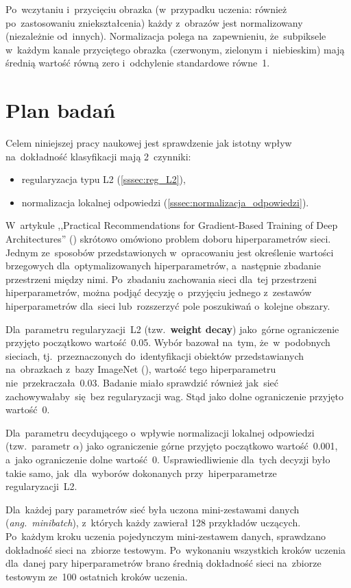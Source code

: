 Po~wczytaniu i~przycięciu obrazka (w~przypadku uczenia: również po~zastosowaniu zniekształcenia) każdy z~obrazów jest
normalizowany (niezależnie od~innych). Normalizacja polega na~zapewnieniu, że~subpiksele w~każdym kanale
przyciętego obrazka (czerwonym, zielonym i~niebieskim) mają średnią wartość równą zero i~odchylenie standardowe równe~1.



\section{Plan badań} \label{sec:plan-badan}
Celem niniejszej pracy naukowej jest sprawdzenie jak istotny wpływ na~dokładność klasyfikacji mają 2~czynniki:
\begin{itemize}
    \item regularyzacja typu L2 (\ref{sssec:reg_L2}),
    \item normalizacja lokalnej odpowiedzi (\ref{sssec:normalizacja_odpowiedzi}).
\end{itemize}

W~artykule ,,Practical Recommendations for Gradient-Based Training of Deep Architectures''
(\cite{practical-gradient-based}) skrótowo omówiono problem doboru hiperparametrów sieci. Jednym ze~sposobów
przedstawionych w~opracowaniu jest określenie wartości brzegowych dla~optymalizowanych hiperparametrów,
a~następnie zbadanie przestrzeni między nimi. Po~zbadaniu zachowania sieci dla~tej przestrzeni hiperparametrów, można podjąć
decyzję o~przyjęciu jednego z~zestawów hiperparametrów dla~sieci lub~rozszerzyć pole poszukiwań o~kolejne obszary.

Dla~parametru regularyzacji~L2 (tzw.~\textbf{weight decay}) jako~górne ograniczenie przyjęto początkowo wartość~0.05.
Wybór bazował na~tym, że~w~podobnych sieciach, tj.~przeznaczonych do~identyfikacji obiektów przedstawianych na~obrazkach
z~bazy ImageNet (\cite{imagenet}), wartość tego hiperparametru nie~przekraczała~0.03. Badanie miało sprawdzić
również jak~sieć zachowywałaby~się~bez regularyzacji wag. Stąd jako dolne ograniczenie przyjęto wartość~0.

Dla~parametru decydującego o~wpływie normalizacji lokalnej odpowiedzi (tzw.~parametr $\alpha$) jako ograniczenie górne
przyjęto początkowo wartość~0.001, a~jako ograniczenie dolne wartość~0. Usprawiedliwienie dla~tych decyzji było
takie samo, jak~dla~wyborów dokonanych przy~hiperparametrze regularyzacji~L2.

Dla~każdej pary parametrów sieć była uczona mini-zestawami danych (\textit{ang.~minibatch}), z~których
każdy zawierał 128 przykładów uczących. Po~każdym kroku uczenia pojedynczym mini-zestawem danych, sprawdzano
dokładność sieci na~zbiorze testowym. Po~wykonaniu wszystkich kroków uczenia dla~danej pary hiperparametrów
brano średnią dokładność sieci na~zbiorze testowym ze~100 ostatnich kroków uczenia.

